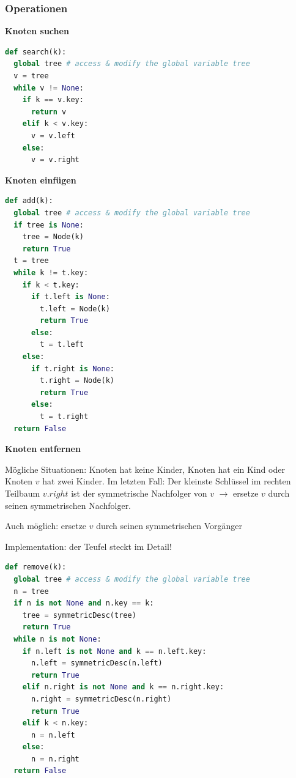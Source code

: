 \begin{sectionbox}
\subsubsection{Operationen}\smallskip
\textbf{Knoten suchen}\par\vspace{-4px}
\begin{lstlisting}[language=Python]
def search(k):
  global tree # access & modify the global variable tree
  v = tree
  while v != None:
    if k == v.key:
      return v
    elif k < v.key:
      v = v.left
    else:
      v = v.right
\end{lstlisting}

\textbf{Knoten einfügen}\par\vspace{-4px}
\begin{lstlisting}[language=Python]
def add(k):
  global tree # access & modify the global variable tree
  if tree is None:
    tree = Node(k)
    return True
  t = tree
  while k != t.key:
    if k < t.key:
      if t.left is None:
        t.left = Node(k)
        return True
      else:
        t = t.left
    else:
      if t.right is None:
        t.right = Node(k)
        return True
      else:
        t = t.right
  return False
\end{lstlisting}

\textbf{Knoten entfernen}\par
Mögliche Situationen: Knoten hat keine Kinder, Knoten hat ein Kind oder Knoten $v$ hat zwei Kinder.
Im letzten Fall: Der kleinste Schlüssel im rechten Teilbaum $v.right$ ist der symmetrische Nachfolger von $v$ $\rightarrow$ ersetze $v$ durch seinen symmetrischen Nachfolger.
\par Auch möglich: ersetze $v$ durch seinen symmetrischen Vorgänger
\par Implementation: der Teufel steckt im Detail!
\vspace{-4px}

\begin{lstlisting}[language=Python]
def remove(k):
  global tree # access & modify the global variable tree
  n = tree
  if n is not None and n.key == k:
    tree = symmetricDesc(tree)
    return True
  while n is not None:
    if n.left is not None and k == n.left.key:
      n.left = symmetricDesc(n.left)
      return True
    elif n.right is not None and k == n.right.key:
      n.right = symmetricDesc(n.right)
      return True
    elif k < n.key:
      n = n.left
    else:
      n = n.right
  return False
\end{lstlisting}


\end{sectionbox}
